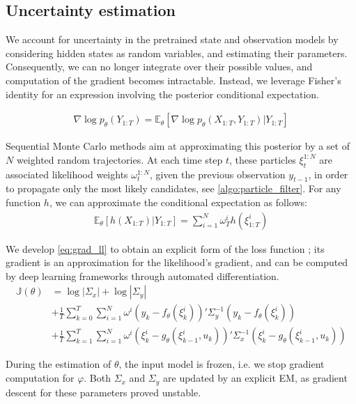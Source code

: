 \documentclass{article}
\begin{document}
\subsection{Uncertainty estimation}%
\label{sub:uncertainty_estimation}

We account for uncertainty in the pretrained state and observation models by considering hidden states as random variables, and estimating their parameters.
Consequently, we can no longer integrate over their possible values, and computation of the gradient becomes intractable.
Instead, we leverage Fisher's identity for an expression involving the posterior conditional expectation.

\begin{align}
	\nabla \log p_\theta(Y_{1:T}) = \mathbb{E}_\theta \left[ \nabla\log p_\theta(X_{1:T}, Y_{1:T}) | Y_{1:T} \right]
	\label{eq:grad_ll}
\end{align}

Sequential Monte Carlo methods aim at approximating this posterior by a set of $N$ weighted random trajectories.
At each time step $t$, these particles $\xi^{1:N}_t$ are associated likelihood weights $\omega^{1:N}_t$, given the previous observation $y_{t-1}$, in order to propagate only the most likely candidates, see \ref{algo:particle_filter}.
For any function $h$, we can approximate the conditional expectation as follows:
\begin{align*}
	\mathbb{E}_\theta \left[ h(X_{1:T}) | Y_{1:T} \right] = \sum_{i=1}^N \omega_T^i h(\xi^i_{1:T})
\end{align*}

We develop \ref{eq:grad_ll} to obtain an explicit form of the loss function ; its gradient is an approximation for the likelihood's gradient, and can be computed by deep learning frameworks through automated differentiation.
\begin{align*}
	\mathbb{J}(\theta) & = \log |\Sigma_x| + \log |\Sigma_y|                                                                                                        \\
	                   & + \frac{1}{T}\sum_{k=0}^T \sum_{i=1}^N \omega^i (y_k - f_\theta(\xi_k^i))' \Sigma_y^{-1} (y_k - f_\theta(\xi_k^i))                         \\
	                   & + \frac{1}{T}\sum_{k=1}^T \sum_{i=1}^N \omega^i (\xi_k^i - g_\theta(\xi_{k-1}^i, u_k))'\Sigma_x^{-1}(\xi_k^i - g_\theta(\xi_{k-1}^i, u_k))
\end{align*}

During the estimation of $\theta$, the input model is frozen, i.e. we stop gradient computation for $\varphi$. Both $\Sigma_x$ and $\Sigma_y$ are updated by an explicit EM, as gradient descent for these parameters proved unstable.
\end{document}
